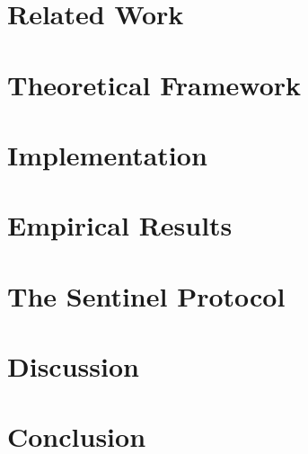 \documentclass[11pt,a4paper]{article}
\begin{document}
\section{Related Work}
\label{sec:related-work}


\section{Theoretical Framework}
\label{sec:theory}


\section{Implementation}
\label{sec:implementation}


\section{Empirical Results}
\label{sec:results}


\section{The Sentinel Protocol}
\label{sec:sentinel}


\section{Discussion}
\label{sec:discussion}


\section{Conclusion}
\label{sec:conclusion}




\end{document}
